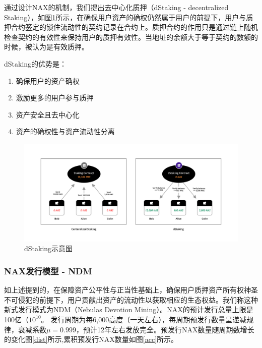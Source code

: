 通过设计NAX的机制，我们提出去中心化质押（dStaking - decentralized Staking），如图\ref{fig:dStaking}所示，在确保用户资产的确权仍然属于用户的前提下，用户与质押合约签定的锁住流动性的契约记录在合约上。质押合约的作用只是通过链上随机检查契约的有效性来保持用户的质押有效性。当地址的余额大于等于契约的数额的时候，被认为是有效质押。

dStaking的优势是：
\begin{enumerate}[\hspace{2cm}(a)]
    \item 确保用户的资产确权
    \item 激励更多的用户参与质押
    \item 资产安全且去中心化
    \item 资产的确权性与资产流动性分离
\end{enumerate}

\begin{figure}[h]
  \centering
    \includegraphics[width=1\textwidth]{../common/dStaking.pdf}
    \caption{dStaking示意图 \label{fig:dStaking}}
\end{figure}

\subsubsection{NAX发行模型 - NDM}
如上述提到的，在保障资产公平性与正当性基础上，确保用户质押资产所有权神圣不可侵犯的前提下，用户贡献出资产的流动性以获取相应的生态权益。我们称这种新式发行模式为NDM（Nebulas Devotion Mining）。NAX的预计发行总量上限是100亿（\(10^{10}\)。 发行周期为每6,000高度（一天左右），每周期预发行数量呈递减规律，衰减系数$\mu=0.999$，预计12年左右发放完全。预发行NAX数量随周期数增长的变化图\ref{dist}所示,累积预发行NAX数量如图\ref{acc}所示。

